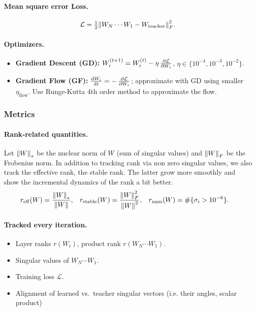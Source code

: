 \documentclass[11pt]{article}
\newcommand{\Wteacher}{\ensuremath{W_{\mathrm{teacher}}}}
\newcommand{\Wi}{\ensuremath{W_i}}
\newcommand{\Wprod}{\ensuremath{W_N\cdots W_1}}
\begin{document}
\paragraph*{Mean square error Loss.}
\[
  \mathcal{L} = \tfrac12 \norm{\Wprod - \Wteacher}_F^{2}.
\]

\paragraph*{Optimizers.}
\begin{itemize}[nosep]
  \item \textbf{Gradient Descent (GD):}\quad
        \(\Wi^{(t+1)} = \Wi^{(t)} - \eta\,\pdv{\mathcal{L}}{\Wi}\),
        \(\eta \in \{10^{-4}, 10^{-3}, 10^{-2}\}\).
  \item \textbf{Gradient Flow (GF):}\quad
        \(\dv{\Wi}{t} = -\,\pdv{\mathcal{L}}{\Wi}\);
        approximate with GD using smaller \(\eta_{\text{flow}}\). Use Runge-Kutta 4th order method to approximate the flow.
\end{itemize}

\subsubsection*{Metrics}

\paragraph*{Rank‐related quantities.}
Let $\norm{W}_*$ be the nuclear norm of $W$ (sum of singular values) and $\norm{W}_F$ be the Frobenius norm. In addition to tracking rank via non zero singular values, we also track the effective rank, the stable rank. The latter grow more smoothly and show the incremental dynamics of the rank a bit better.
\begin{align*}
  r_{\mathrm{eff}}(W) &= \frac{\norm{W}_*}{\norm{W}}, &
  r_{\mathrm{stable}}(W) &= \frac{\norm{W}_F^2}{\norm{W}^2}, &
  r_{\mathrm{num}}(W) &= \#\{\sigma_i > 10^{-6}\}.
\end{align*}

\paragraph*{Tracked every iteration.}
\begin{itemize}[nosep]
  \item Layer ranks \(r(\Wi)\), product rank \(r(\Wprod)\).
  \item Singular values of \(\Wprod\).
  \item Training loss \(\mathcal{L}\).
  \item Alignment of learned vs.\ teacher singular vectors (i.e. their angles, scalar product)
\end{itemize}
\end{document}
